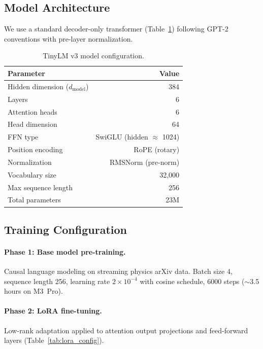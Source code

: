\documentclass[11pt]{article}
\begin{document}
\subsection{Model Architecture}

We use a standard decoder-only transformer (Table~\ref{tab:model_config}) following GPT-2 conventions with pre-layer normalization.

\begin{table}[t]
\centering
\caption{TinyLM v3 model configuration.}
\label{tab:model_config}
\begin{tabular}{lr}
\toprule
\textbf{Parameter} & \textbf{Value} \\
\midrule
Hidden dimension ($d_\text{model}$) & 384 \\
Layers & 6 \\
Attention heads & 6 \\
Head dimension & 64 \\
FFN type & SwiGLU (hidden $\approx$ 1024) \\
Position encoding & RoPE (rotary) \\
Normalization & RMSNorm (pre-norm) \\
Vocabulary size & 32,000 \\
Max sequence length & 256 \\
Total parameters & 23M \\
\bottomrule
\end{tabular}
\end{table}

\subsection{Training Configuration}

\paragraph{Phase 1: Base model pre-training.}
Causal language modeling on streaming physics arXiv data. Batch size 4, sequence length 256, learning rate $2 \times 10^{-4}$ with cosine schedule, 6000 steps ($\sim$3.5 hours on M3~Pro).

\paragraph{Phase 2: LoRA fine-tuning.}
Low-rank adaptation applied to attention output projections and feed-forward layers (Table~\ref{tab:lora_config}).
\end{document}
